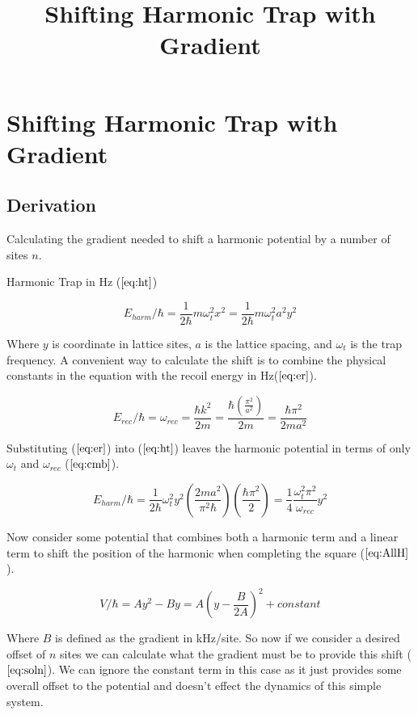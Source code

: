 \documentclass[12pt]{article}
\begin{document}
\title{Shifting Harmonic Trap with Gradient}
\section{Shifting Harmonic Trap with Gradient}
\subsection{Derivation}

Calculating the gradient needed to shift a harmonic potential by a number of sites $n$.

Harmonic Trap in Hz ($\ref{eq:ht}$)

\begin{equation}
E_{harm} / \hbar=\frac{1}{2 \hbar} m \omega_t^2 x^2 = \frac{1}{2 \hbar} m \omega_t^2 a^2 y^2 
\label{eq:ht}
\end{equation}

Where $y$ is coordinate in lattice sites, $a$ is the lattice spacing, and $\omega_t$ is the trap frequency. A convenient way to calculate the shift is to combine the physical constants in the equation with the recoil energy in Hz($\ref{eq:er}$).

\begin{equation}
E_{rec} / \hbar = \omega_{rec} = \frac{\hbar k^2}{2 m} = \frac{\hbar \left ( \frac{\pi^2}{a^2}\right )}{2 m}=\frac{\hbar \pi^2}{2 m a^2}
\label{eq:er}
\end{equation}

Substituting ($\ref{eq:er}$) into ($\ref{eq:ht}$) leaves the harmonic potential in terms of only $\omega_t$ and $\omega_{rec}$  ($\ref{eq:cmb}$).

\begin{equation}
E_{harm} / \hbar = \frac{1}{2 \hbar} \omega_t^2 y^2 \left (\frac{2 m a^2}{\pi^2 \hbar} \right ) \left ( \frac{\hbar \pi^2}{2} \right ) = \frac{1}{4 }\frac{\omega_t^2 \pi^2}{\omega_{rec}}y^2
\label{eq:cmb}
\end{equation}

Now consider some potential that combines both a harmonic term and a linear term to shift the position of the harmonic when completing the square ($\ref{eq:AllH}$).

\begin{equation}
V / \hbar = Ay^2 - By = A\left ( y - \frac{B}{2A} \right )^2 + constant
\label{eq:AllH}
\end{equation}

Where $B$ is defined as the gradient in kHz/site. So now if we consider a desired offset of $n$ sites we can calculate what the gradient must be to provide this shift ($\ref{eq:soln}$). We can ignore the constant term in this case as it just provides some overall offset to the potential and doesn't effect the dynamics of this simple system.
\end{document}
